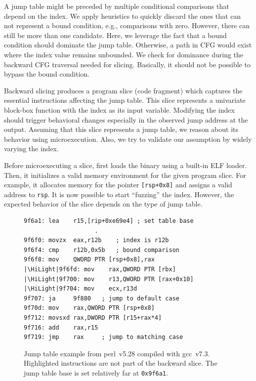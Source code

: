 A jump table might be preceded by multiple conditional comparisons that depend on the index.
We apply heuristics to quickly discard the ones that can not represent a bound condition, e.g., comparisons with zero.
However, there can still be more than one candidate.
Here, we leverage the fact that a bound condition should dominate the jump table.
Otherwise, a path in CFG would exist where the index value remains unbounded.
We check for dominance during the backward CFG traversal needed for slicing.
Basically, it should not be possible to bypass the bound condition.

Backward slicing produces a program slice (code fragment) which captures the essential instructions affecting the jump table.
This slice represents a univariate block-box function with the index as its input variable.
Modifying the index should trigger behavioral changes especially in the observed jump address at the output.
Assuming that this slice represents a jump table, we reason about its behavior using microexecution.
Also, we try to validate our assumption by widely varying the index.

Before microexecuting a slice, {\bcov} first loads the binary using a built-in ELF loader.
Then, it initializes a valid memory environment for the given program slice.
For example, it allocates memory for the pointer \texttt{[rsp+0x8]} and assigns a valid address to \texttt{rsp}.
It is now possible to start ``fuzzing'' the index.
However, the expected behavior of the slice depends on the type of jump table.


\begin{figure}[t!]
\centering
\begin{lstlisting}[style=custom-x64]
9f6a1: lea    r15,[rip+0xe69e4] ; set table base
                    .
9f6f0: movzx  eax,r12b    ; index is r12b
9f6f4: cmp    r12b,0x5b   ; bound comparison
9f6f8: mov    QWORD PTR [rsp+0x8],rax
|\HiLight|9f6fd: mov    rax,QWORD PTR [rbx]
|\HiLight|9f700: mov    r13,QWORD PTR [rax+0x10]
|\HiLight|9f704: mov    ecx,r13d
9f707: ja     9f880   ; jump to default case
9f70d: mov    rax,QWORD PTR [rsp+0x8]
9f712: movsxd rax,DWORD PTR [r15+rax*4]
9f716: add    rax,r15
9f719: jmp    rax     ; jump to matching case
\end{lstlisting}
\vspace{-2pt}
    \caption[workflow]{Jump table example from \textsf{perl}~v5.28 compiled with \textsf{gcc}~v7.3.
        Highlighted instructions are not part of the backward slice.
        The jump table base is set relatively far at \texttt{0x9f6a1}.}
    \label{fig:jump-table-example}
\end{figure}


